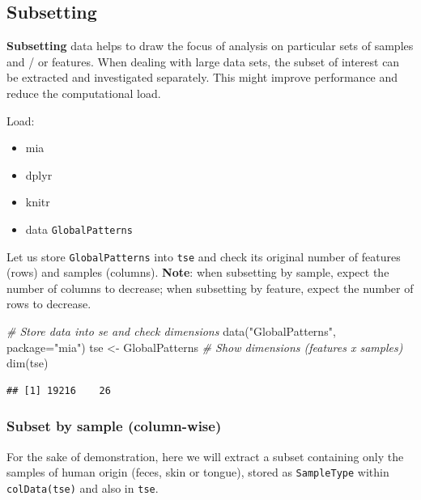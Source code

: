 \documentclass[
]{book}
\newenvironment{Shaded}{\begin{snugshade}}{\end{snugshade}}
\newcommand{\AttributeTok}[1]{\textcolor[rgb]{0.77,0.63,0.00}{#1}}
\newcommand{\CommentTok}[1]{\textcolor[rgb]{0.56,0.35,0.01}{\textit{#1}}}
\newcommand{\FunctionTok}[1]{\textcolor[rgb]{0.00,0.00,0.00}{#1}}
\newcommand{\NormalTok}[1]{#1}
\newcommand{\OtherTok}[1]{\textcolor[rgb]{0.56,0.35,0.01}{#1}}
\newcommand{\StringTok}[1]{\textcolor[rgb]{0.31,0.60,0.02}{#1}}
\providecommand{\tightlist}{%
  \setlength{\itemsep}{0pt}\setlength{\parskip}{0pt}}
\begin{document}
\hypertarget{subsetting}{%
\subsection{Subsetting}\label{subsetting}}

\textbf{Subsetting} data helps to draw the focus of analysis on particular
sets of samples and / or features. When dealing with large data
sets, the subset of interest can be extracted and investigated
separately. This might improve performance and reduce the
computational load.

Load:

\begin{itemize}
\tightlist
\item
  mia
\item
  dplyr
\item
  knitr
\item
  data \texttt{GlobalPatterns}
\end{itemize}

Let us store \texttt{GlobalPatterns} into \texttt{tse} and check its original number of features (rows) and samples (columns). \textbf{Note}: when subsetting by sample, expect the number of columns to decrease; when subsetting by feature, expect the number of rows to decrease.

\begin{Shaded}
\begin{Highlighting}[]
\CommentTok{\# Store data into se and check dimensions}
\FunctionTok{data}\NormalTok{(}\StringTok{"GlobalPatterns"}\NormalTok{, }\AttributeTok{package=}\StringTok{"mia"}\NormalTok{)}
\NormalTok{tse }\OtherTok{\textless{}{-}}\NormalTok{ GlobalPatterns}
\CommentTok{\# Show dimensions (features x samples)}
\FunctionTok{dim}\NormalTok{(tse) }
\end{Highlighting}
\end{Shaded}

\begin{verbatim}
## [1] 19216    26
\end{verbatim}

\hypertarget{subset-by-sample-column-wise}{%
\subsubsection{Subset by sample (column-wise)}\label{subset-by-sample-column-wise}}

For the sake of demonstration, here we will extract a subset containing only the samples of human origin (feces, skin or tongue), stored as \texttt{SampleType} within \texttt{colData(tse)} and also in \texttt{tse}.
\end{document}
